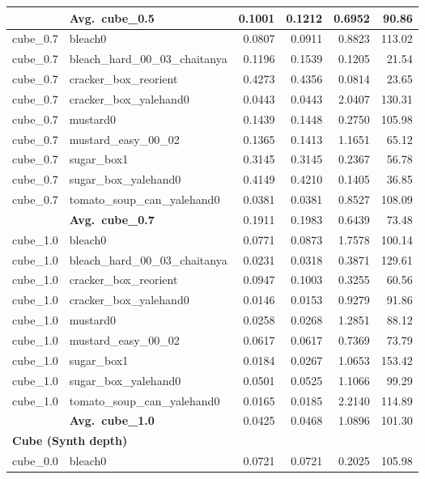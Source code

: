\begin{longtable}{llrrrr}
  \cmidrule{2-6}
  & \textbf{Avg.~cube_0.5} & 0.1001 & 0.1212 & 0.6952 & 90.86 \\
  \midrule
  cube_0.7 & bleach0 & 0.0807 & 0.0911 & 0.8823 & 113.02 \\
  cube_0.7 & bleach\_hard\_00\_03\_chaitanya & 0.1196 & 0.1539 & 0.1205 & 21.54 \\
  cube_0.7 & cracker\_box\_reorient & 0.4273 & 0.4356 & 0.0814 & 23.65 \\
  cube_0.7 & cracker\_box\_yalehand0 & 0.0443 & 0.0443 & 2.0407 & 130.31 \\
  cube_0.7 & mustard0 & 0.1439 & 0.1448 & 0.2750 & 105.98 \\
  cube_0.7 & mustard\_easy\_00\_02 & 0.1365 & 0.1413 & 1.1651 & 65.12 \\
  cube_0.7 & sugar\_box1 & 0.3145 & 0.3145 & 0.2367 & 56.78 \\
  cube_0.7 & sugar\_box\_yalehand0 & 0.4149 & 0.4210 & 0.1405 & 36.85 \\
  cube_0.7 & tomato\_soup\_can\_yalehand0 & 0.0381 & 0.0381 & 0.8527 & 108.09 \\
  \cmidrule{2-6}
  & \textbf{Avg.~cube_0.7} & 0.1911 & 0.1983 & 0.6439 & 73.48 \\
  \midrule
  cube_1.0 & bleach0 & 0.0771 & 0.0873 & 1.7578 & 100.14 \\
  cube_1.0 & bleach\_hard\_00\_03\_chaitanya & 0.0231 & 0.0318 & 0.3871 & 129.61 \\
  cube_1.0 & cracker\_box\_reorient & 0.0947 & 0.1003 & 0.3255 & 60.56 \\
  cube_1.0 & cracker\_box\_yalehand0 & 0.0146 & 0.0153 & 0.9279 & 91.86 \\
  cube_1.0 & mustard0 & 0.0258 & 0.0268 & 1.2851 & 88.12 \\
  cube_1.0 & mustard\_easy\_00\_02 & 0.0617 & 0.0617 & 0.7369 & 73.79 \\
  cube_1.0 & sugar\_box1 & 0.0184 & 0.0267 & 1.0653 & 153.42 \\
  cube_1.0 & sugar\_box\_yalehand0 & 0.0501 & 0.0525 & 1.1066 & 99.29 \\
  cube_1.0 & tomato\_soup\_can\_yalehand0 & 0.0165 & 0.0185 & 2.2140 & 114.89 \\
  \cmidrule{2-6}
  & \textbf{Avg.~cube_1.0} & 0.0425 & 0.0468 & 1.0896 & 101.30 \\
  \midrule
\multicolumn{6}{l}{\textbf{Cube (Synth depth)}} \\
\midrule
  cube_0.0 & bleach0 & 0.0721 & 0.0721 & 0.2025 & 105.98 \\

\end{longtable}
